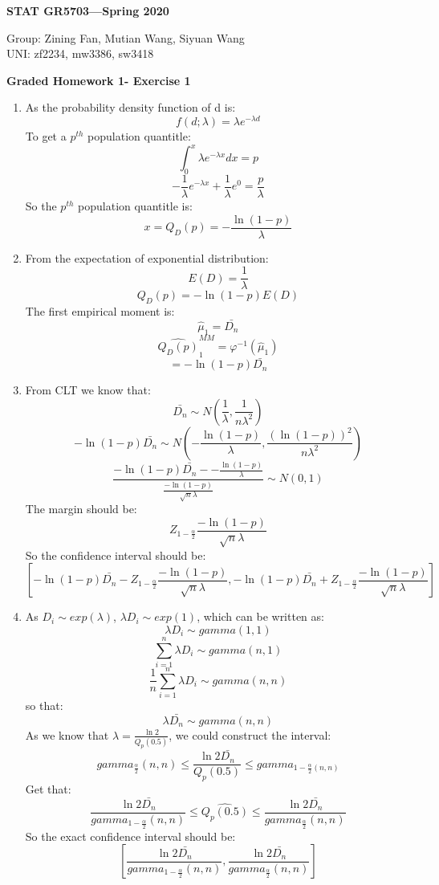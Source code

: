 \documentclass[11pt]{article}
\begin{document}
\begin{flushright}
{\bf STAT GR5703---Spring 2020}
\end{flushright}
\begin{flushleft}
Group: Zining Fan, Mutian Wang, Siyuan Wang\\
UNI: zf2234, mw3386, sw3418\\
\end{flushleft}

\bigskip
\centerline{\bf Graded Homework 1- Exercise 1}

\bigskip 
\begin{enumerate}
\item
As the probability density function of d is:
\[f(d;\lambda) = \lambda e^{-\lambda d}\]
To get a $p^{th}$ population quantitle:
\[\int_{0}^{x} \lambda e^{-\lambda x} dx = p\]
\[-\frac{1}{\lambda} e^{-\lambda x} + \frac{1}{\lambda} e^0= \frac{p}{\lambda}\]
So the $p^{th}$ population quantitle is:
\[x = Q_D(p) = -\frac{\ln(1-p)}{\lambda}\]
\item
From the expectation of exponential distribution:
\[E(D) = \frac{1}{\lambda}\]
\[Q_D(p) = -\ln(1-p) E(D)\]
The first empirical moment is: 
\[\hat{\mu}_1 = \bar{D_n}\]
\[\hat{Q_D(p)}^{MM}_1 = \varphi^{-1}(\hat{\mu}_1)\]
\[= -\ln(1-p) \bar{D_n}\]

\item
From CLT we know that:
\[\bar{D_n} \sim N(\frac{1}{\lambda},\frac{1}{n\lambda^2})\]
\[-\ln(1-p) \bar{D_n} \sim N(-\frac{\ln(1-p)}{\lambda},\frac{(\ln(1-p))^2}{n\lambda^2})\]
\[\frac{-\ln(1-p) \bar{D_n} - -\frac{\ln(1-p)}{\lambda}}{\frac{-\ln(1-p)}{\sqrt{n}\lambda}}\sim N(0,1)\]
The margin should be:
\[Z_{1-\frac{\alpha}{2}} \frac{-\ln(1-p)}{\sqrt{n} \lambda}\]
So the confidence interval should be:
\[[-\ln(1-p) \bar{D_n} -  Z_{1-\frac{\alpha}{2}} \frac{-\ln(1-p)}{\sqrt{n} \lambda},-\ln(1-p) \bar{D_n} +  Z_{1-\frac{\alpha}{2}} \frac{-\ln(1-p)}{\sqrt{n} \lambda}]\]


\item
As $D_i \sim exp(\lambda)$,
$\lambda D_i \sim exp(1)$, which can be written as:
\[\lambda D_i \sim gamma(1,1)\]
\[\sum \limits_{i=1}^{n} \lambda D_i \sim gamma(n,1)\]
\[\frac{1}{n}\sum \limits_{i=1}^{n} \lambda D_i \sim gamma(n,n)\]
so that:
\[\lambda \bar{D_n} \sim gamma(n,n)\]
As we know that $\lambda = \frac{\ln{2}}{Q_p(0.5)}$, we could construct the interval:
\[gamma_{\frac{\alpha}{2}}(n,n) \leq \frac{\ln2 \bar{D_n}}{Q_p(0.5)} \leq gamma_{1-\frac{\alpha}{2}(n,n)}\]
Get that:
\[\frac{\ln{2}\bar{D_n}}{gamma_{1-\frac{\alpha}{2}}(n,n)} \leq \hat{Q_p(0.5)} \leq \frac{\ln{2}\bar{D_n}}{gamma_{\frac{\alpha}{2}}(n,n)}\]
So the exact confidence interval should be:
\[[\frac{\ln{2}\bar{D_n}}{gamma_{1-\frac{\alpha}{2}}(n,n)},\frac{\ln{2}\bar{D_n}}{gamma_{\frac{\alpha}{2}}(n,n)}]\]

\bigskip 
\end{enumerate}
\end{document}
